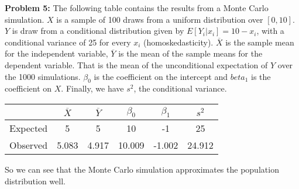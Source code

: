 \documentclass[11pt]{article}
\begin{document}
\textbf{Problem 5:}  The following table contains the results from a Monte Carlo simulation.  $X$ is a sample of 100 draws from a uniform distribution over $[0, 10]$. $Y$ is draw from a conditional distribution given by $E[Y_{i}|x_{i}] = 10 - x_{i}$, with a conditional variance of 25 for every $x_{i}$ (homoskedasticity).  $\overline{X}$ is the sample mean for the independent variable, $\overline{Y}$ is the mean of the sample means for the dependent variable.  That is the mean of the unconditional expectation of $Y$ over the 1000 simulations.  $\beta_{0}$ is the coefficient on the intercept and $beta_{1}$ is the coefficient on $X$. Finally, we have $s^{2}$, the conditional variance.
{
\setlength{\extrarowheight}{3pt}
    \begin{center}
        \begin{tabular}{ | c | c | c | c | c | c |}
            \hline
            & $\overline{X}$ & $\overline{Y}$ & $\beta_{0}$ & $\beta_{1}$ & $s^{2}$\\
            \hline
            Expected & 5 & 5 & 10 & -1 & 25\\
            \hline
            Observed & 5.083 & 4.917 & 10.009 & -1.002 & 24.912\\
            \hline
        \end{tabular}
    \end{center}
}

So we can see that the Monte Carlo simulation approximates the population distribution well.
\end{document}
